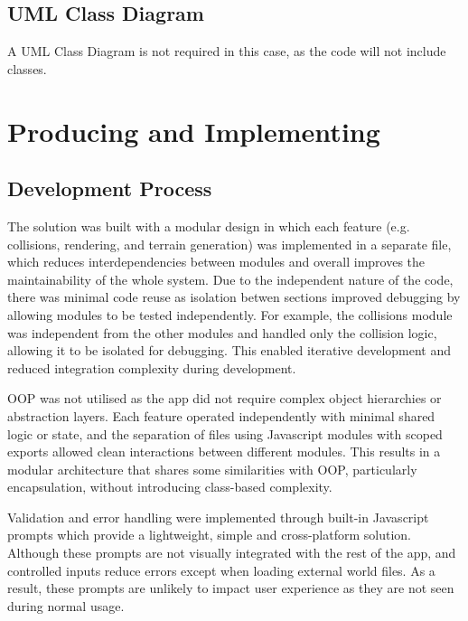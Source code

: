 \documentclass[14pt]{article}
\begin{document}
\subsection{UML Class Diagram}
A UML Class Diagram is not required in this case, as the code will not include classes.


\section{Producing and Implementing}

\subsection{Development Process}
The solution was built with a modular design in which each feature (e.g. collisions, rendering, and terrain generation) was implemented in a separate file, which reduces interdependencies between modules and overall improves the maintainability of the whole system.
Due to the independent nature of the code, there was minimal code reuse as isolation betwen sections improved debugging by allowing modules to be tested independently.
For example, the collisions module was independent from the other modules and handled only the collision logic, allowing it to be isolated for debugging.
This enabled iterative development and reduced integration complexity during development.

OOP was not utilised as the app did not require complex object hierarchies or abstraction layers.
Each feature operated independently with minimal shared logic or state, and the separation of files using Javascript modules with scoped exports allowed clean interactions between different modules.
This results in a modular architecture that shares some similarities with OOP, particularly encapsulation, without introducing class-based complexity.

Validation and error handling were implemented through built-in Javascript prompts which provide a lightweight, simple and cross-platform solution.
Although these prompts are not visually integrated with the rest of the app, and controlled inputs reduce errors except when loading external world files.
As a result, these prompts are unlikely to impact user experience as they are not seen during normal usage.
\end{document}
